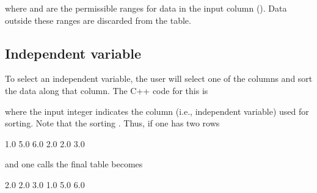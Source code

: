 \documentclass[letterpaper,10pt,english]{sphinxmanual}
\begin{document}
\begin{sphinxVerbatim}[commandchars=\\\{\},formatcom=\scriptsize]
         
\end{sphinxVerbatim}

where  and  are the permissible ranges for data in the input column ().
Data outside these ranges are discarded from the table.


\subsection{Independent variable}
\label{\detokenize{Utilities/LookupTable:independent-variable}}
To select an independent variable, the user will select one of the columns and sort the data along that column.
The C++ code for this is

\begin{sphinxVerbatim}[commandchars=\\\{\},formatcom=\scriptsize]
  
   
\end{sphinxVerbatim}

where the input integer indicates the column (i.e., independent variable) used for sorting.
Note that the sorting .
Thus, if one has two rows

\begin{sphinxVerbatim}[commandchars=\\\{\},formatcom=\scriptsize]
1.0  5.0  6.0
2.0  2.0  3.0
\end{sphinxVerbatim}

and one calls  the final table becomes

\begin{sphinxVerbatim}[commandchars=\\\{\},formatcom=\scriptsize]
2.0  2.0  3.0
1.0  5.0  6.0
\end{sphinxVerbatim}
\end{document}
